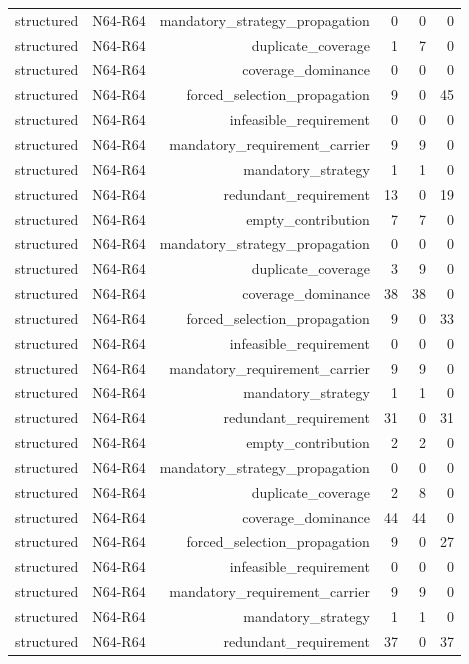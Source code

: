 {\begin{longtable}{lrrrrr}
structured & N64-R64 & mandatory\_strategy\_propagation & 0 & 0 & 0 \\
structured & N64-R64 & duplicate\_coverage & 1 & 7 & 0 \\
structured & N64-R64 & coverage\_dominance & 0 & 0 & 0 \\
structured & N64-R64 & forced\_selection\_propagation & 9 & 0 & 45 \\
structured & N64-R64 & infeasible\_requirement & 0 & 0 & 0 \\
structured & N64-R64 & mandatory\_requirement\_carrier & 9 & 9 & 0 \\
structured & N64-R64 & mandatory\_strategy & 1 & 1 & 0 \\
structured & N64-R64 & redundant\_requirement & 13 & 0 & 19 \\
structured & N64-R64 & empty\_contribution & 7 & 7 & 0 \\
structured & N64-R64 & mandatory\_strategy\_propagation & 0 & 0 & 0 \\
structured & N64-R64 & duplicate\_coverage & 3 & 9 & 0 \\
structured & N64-R64 & coverage\_dominance & 38 & 38 & 0 \\
structured & N64-R64 & forced\_selection\_propagation & 9 & 0 & 33 \\
structured & N64-R64 & infeasible\_requirement & 0 & 0 & 0 \\
structured & N64-R64 & mandatory\_requirement\_carrier & 9 & 9 & 0 \\
structured & N64-R64 & mandatory\_strategy & 1 & 1 & 0 \\
structured & N64-R64 & redundant\_requirement & 31 & 0 & 31 \\
structured & N64-R64 & empty\_contribution & 2 & 2 & 0 \\
structured & N64-R64 & mandatory\_strategy\_propagation & 0 & 0 & 0 \\
structured & N64-R64 & duplicate\_coverage & 2 & 8 & 0 \\
structured & N64-R64 & coverage\_dominance & 44 & 44 & 0 \\
structured & N64-R64 & forced\_selection\_propagation & 9 & 0 & 27 \\
structured & N64-R64 & infeasible\_requirement & 0 & 0 & 0 \\
structured & N64-R64 & mandatory\_requirement\_carrier & 9 & 9 & 0 \\
structured & N64-R64 & mandatory\_strategy & 1 & 1 & 0 \\
structured & N64-R64 & redundant\_requirement & 37 & 0 & 37 \\

\end{longtable}}
